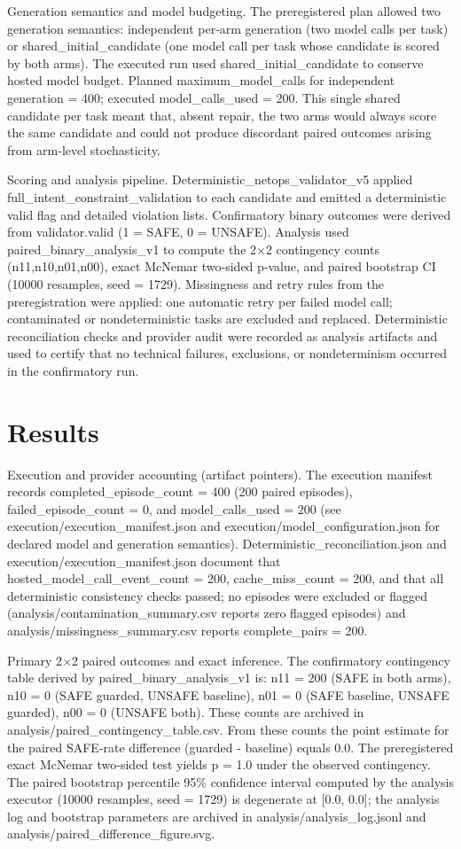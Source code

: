 \documentclass[conference]{IEEEtran}
\begin{document}
Generation semantics and model budgeting. The preregistered plan allowed two generation semantics: independent per‑arm generation (two model calls per task) or shared\_initial\_candidate (one model call per task whose candidate is scored by both arms). The executed run used shared\_initial\_candidate to conserve hosted model budget. Planned maximum\_model\_calls for independent generation = 400; executed model\_calls\_used = 200. This single shared candidate per task meant that, absent repair, the two arms would always score the same candidate and could not produce discordant paired outcomes arising from arm‑level stochasticity.

Scoring and analysis pipeline. Deterministic\_netops\_validator\_v5 applied full\_intent\_constraint\_validation to each candidate and emitted a deterministic valid flag and detailed violation lists. Confirmatory binary outcomes were derived from validator.valid (1 = SAFE, 0 = UNSAFE). Analysis used paired\_binary\_analysis\_v1 to compute the 2\ensuremath{\times}2 contingency counts (n11,n10,n01,n00), exact McNemar two‑sided p‑value, and paired bootstrap CI (10000 resamples, seed = 1729). Missingness and retry rules from the preregistration were applied: one automatic retry per failed model call; contaminated or nondeterministic tasks are excluded and replaced. Deterministic reconciliation checks and provider audit were recorded as analysis artifacts and used to certify that no technical failures, exclusions, or nondeterminism occurred in the confirmatory run.

\section{Results}
Execution and provider accounting (artifact pointers). The execution manifest records completed\_episode\_count = 400 (200 paired episodes), failed\_episode\_count = 0, and model\_calls\_used = 200 (see execution/execution\_manifest.json and execution/model\_configuration.json for declared model and generation semantics). Deterministic\_reconciliation.json and execution/execution\_manifest.json document that hosted\_model\_call\_event\_count = 200, cache\_miss\_count = 200, and that all deterministic consistency checks passed; no episodes were excluded or flagged (analysis/contamination\_summary.csv reports zero flagged episodes) and analysis/missingness\_summary.csv reports complete\_pairs = 200.

Primary 2\ensuremath{\times}2 paired outcomes and exact inference. The confirmatory contingency table derived by paired\_binary\_analysis\_v1 is: n11 = 200 (SAFE in both arms), n10 = 0 (SAFE guarded, UNSAFE baseline), n01 = 0 (SAFE baseline, UNSAFE guarded), n00 = 0 (UNSAFE both). These counts are archived in analysis/paired\_contingency\_table.csv. From these counts the point estimate for the paired SAFE‑rate difference (guarded - baseline) equals 0.0. The preregistered exact McNemar two‑sided test yields p = 1.0 under the observed contingency. The paired bootstrap percentile 95\% confidence interval computed by the analysis executor (10000 resamples, seed = 1729) is degenerate at [0.0, 0.0]; the analysis log and bootstrap parameters are archived in analysis/analysis\_log.jsonl and analysis/paired\_difference\_figure.svg.
\end{document}
